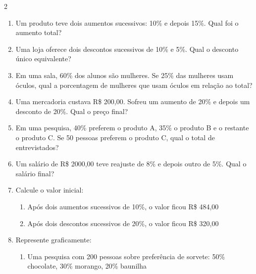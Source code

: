 \documentclass[11pt]{article}
\begin{document}
\begin{multicols}{2}
\begin{enumerate}[leftmargin=*, start=9]
\end{enumerate}

\begin{enumerate}[leftmargin=*, start=15]

\item Um produto teve dois aumentos sucessivos: 10\% e depois 15\%. Qual foi o aumento total?

\item Uma loja oferece dois descontos sucessivos de 10\% e 5\%. Qual o desconto único equivalente?

\item Em uma sala, 60\% dos alunos são mulheres. Se 25\% das mulheres usam óculos, qual a porcentagem de mulheres que usam óculos em relação ao total?

\item Uma mercadoria custava R\$ 200,00. Sofreu um aumento de 20\% e depois um desconto de 20\%. Qual o preço final?

\item Em uma pesquisa, 40\% preferem o produto A, 35\% o produto B e o restante o produto C. Se 50 pessoas preferem o produto C, qual o total de entrevistados?

\item Um salário de R\$ 2000,00 teve reajuste de 8\% e depois outro de 5\%. Qual o salário final?

\item Calcule o valor inicial:
\begin{enumerate}[label=\alph*)]
\item Após dois aumentos sucessivos de 10\%, o valor ficou R\$ 484,00
\item Após dois descontos sucessivos de 20\%, o valor ficou R\$ 320,00
\end{enumerate}

\item Represente graficamente:
\begin{enumerate}[label=\alph*)]
\item Uma pesquisa com 200 pessoas sobre preferência de sorvete: 50\% chocolate, 30\% morango, 20\% baunilha
\end{enumerate}

\end{enumerate}

\end{multicols}
\end{document}
